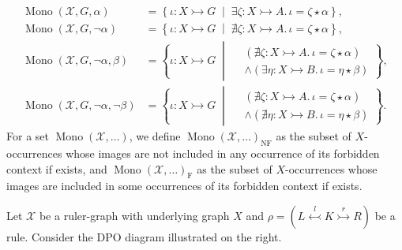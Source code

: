 \begin{notation}
\begin{align*}
        \\
        \operatorname{Mono}(\mathcal{X},G,\alpha) &= \left\{ \iota \colon X \rightarrowtail G 
        \;\middle|\; 
        \exists \zeta \colon X \rightarrowtail A.\, \iota = \zeta \star \alpha \right\}, 
        \\
        \operatorname{Mono}(\mathcal{X},G,\lnot \alpha) &= \left\{ \iota \colon X \rightarrowtail G 
        \;\middle|\; 
        \nexists \zeta \colon X \rightarrowtail A.\, \iota = \zeta \star \alpha \right\}, 
        \\
        \operatorname{Mono}(\mathcal{X},G,\lnot \alpha, \beta) &= \left\{ 
            \iota \colon X \rightarrowtail G \;\middle|\; 
                \begin{aligned}  
                    &(\nexists \zeta \colon X \rightarrowtail A.\, \iota = \zeta \star \alpha) \\ 
                    &\land (\exists \eta \colon X \rightarrowtail B.\, \iota = \eta \star \beta)
                \end{aligned}
        \right\},
        \\
        \operatorname{Mono}(\mathcal{X},G,\lnot \alpha, \lnot \beta) &= \left\{ 
            \iota \colon X \rightarrowtail G \;\middle|\; 
                \begin{aligned}
                    &(\nexists \zeta \colon X \rightarrowtail A.\, \iota = \zeta \star \alpha) \\
                    &\land (\nexists \eta \colon X \rightarrowtail B.\, \iota = \eta \star \beta)
                \end{aligned}
        \right\}.
    \end{align*}
    For a set $\operatorname{Mono}(\mathcal{X},\dots)$, we define $\operatorname{Mono}(\mathcal{X},\dots)_{\operatorname{NF}}$ as the subset of \( X \)-occurrences whose images are not included in any occurrence of its forbidden context if exists, and  $\operatorname{Mono}(\mathcal{X},\dots)_{\operatorname{F}}$ as the subset of \( X \)-occurrences whose images are included in some occurrences of its forbidden context if exists. 
\end{notation}
\noindent
\begin{minipage}{0.7\textwidth}\setlength{\parindent}{1em}
    Let $\mathcal{X}$ be a ruler-graph with underlying graph $X$ and \( \rho = (L \overset{l}{\leftarrowtail} K \overset{r}{\rightarrowtail} R) \) be a rule. 
    Consider the DPO diagram illustrated on the right. 
\end{minipage}%
